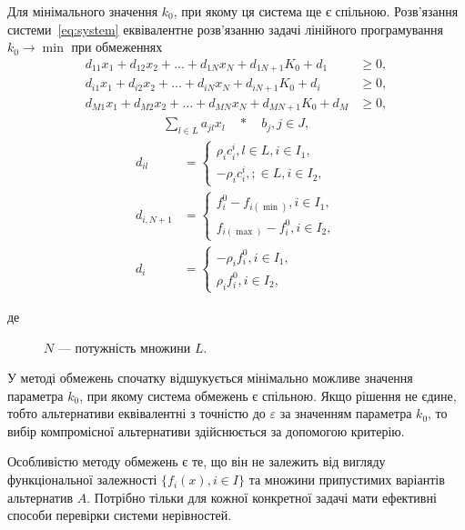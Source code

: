 Для мінімального значення $k_0$, при якому ця система ще є спільною. 
Розв'язання системи~\eqref{eq:system} еквівалентне розв'язанню задачі лінійного програмування $k_0 \to \min$ при обмеженнях 
\begin{align*}
	d_{11} x_1 	+ d_{12} x_2 + \ldots + d_{1N} x_N + d_{1 N+1} K_0 + d_1 &\geq 0, \\
	d_{i1} x_1 	+ d_{i2} x_2 + \ldots + d_{iN} x_N + d_{i N+1} K_0 + d_i &\geq 0, \\
	d_{M1} x_1 	+ d_{M2} x_2 + \ldots + d_{MN} x_N + d_{M N+1} K_0 + d_M &\geq 0,
\end{align*}
\begin{gather*}
	\sum_{l \in L}{a_{jl} x_l \quad * \quad b_j}, j \in J,
\end{gather*}
\begin{align*}
	d_{il} &= 
	\begin{cases}
		\rho_i c_{i}^i, l \in L, i \in I_1, \\
		-\rho_i c_{i}^i, ; \in L, i \in I_2, 
	\end{cases} \\
	d_{i, N+1} &= 
	\begin{cases}
		f_{i}^0 - f_{i(\min)}, i \in I_1, \\
		f_{i(\max)} - f_{i}^0 , i \in I_2,
	\end{cases} \\
	d_{i} &= 
	\begin{cases}
		- \rho_i f_{i}^0, i \in I_1, \\
		\rho_i f_{i}^0, i \in I_2, 
	\end{cases}
\end{align*}
\begin{description}
\item[де] $N$ --- потужність множини $L$.
\end{description}

У методі обмежень спочатку відшукується мінімально можливе значення параметра $k_0$, при якому система обмежень є спільною. 
Якщо рішення не єдине, тобто альтернативи еквівалентні з точністю до $\varepsilon$ за значенням параметра $k_0$, то вибір компромісної альтернативи здійснюється за допомогою критерію.

Особливістю методу обмежень є те, що він не залежить від вигляду функціональної залежності $\{ f_i(x), i \in I \}$ та множини припустимих варіантів альтернатив $A$.
Потрібно тільки для кожної конкретної задачі мати ефективні способи перевірки системи нерівностей.  


